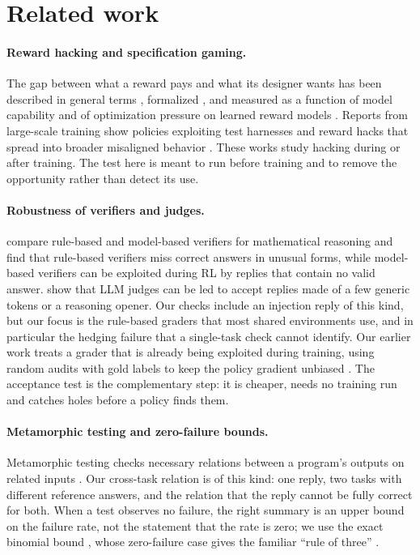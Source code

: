 \section{Related work}
\label{sec:related}

\paragraph{Reward hacking and specification gaming.} The gap between what a reward pays and what its designer wants has been described in general terms \citep{amodei2016concrete}, formalized \citep{skalse2022defining}, and measured as a function of model capability \citep{pan2022effects} and of optimization pressure on learned reward models \citep{gao2023scaling}. Reports from large-scale training show policies exploiting test harnesses \citep{baker2025monitoring} and reward hacks that spread into broader misaligned behavior \citep{macdiarmid2025natural}. These works study hacking during or after training. The test here is meant to run before training and to remove the opportunity rather than detect its use.

\paragraph{Robustness of verifiers and judges.} \citet{huang2025verifiers} compare rule-based and model-based verifiers for mathematical reasoning and find that rule-based verifiers miss correct answers in unusual forms, while model-based verifiers can be exploited during RL by replies that contain no valid answer. \citet{zhao2025onetoken} show that LLM judges can be led to accept replies made of a few generic tokens or a reasoning opener. Our checks include an injection reply of this kind, but our focus is the rule-based graders that most shared environments use, and in particular the hedging failure that a single-task check cannot identify. Our earlier work treats a grader that is already being exploited during training, using random audits with gold labels to keep the policy gradient unbiased \citep{feryad2026rewardaudit}. The acceptance test is the complementary step: it is cheaper, needs no training run and catches holes before a policy finds them.

\paragraph{Metamorphic testing and zero-failure bounds.} Metamorphic testing checks necessary relations between a program's outputs on related inputs \citep{segura2016survey,chen2018metamorphic}. Our cross-task relation is of this kind: one reply, two tasks with different reference answers, and the relation that the reply cannot be fully correct for both. When a test observes no failure, the right summary is an upper bound on the failure rate, not the statement that the rate is zero; we use the exact binomial bound \citep{clopper1934}, whose zero-failure case gives the familiar ``rule of three'' \citep{hanley1983}.

